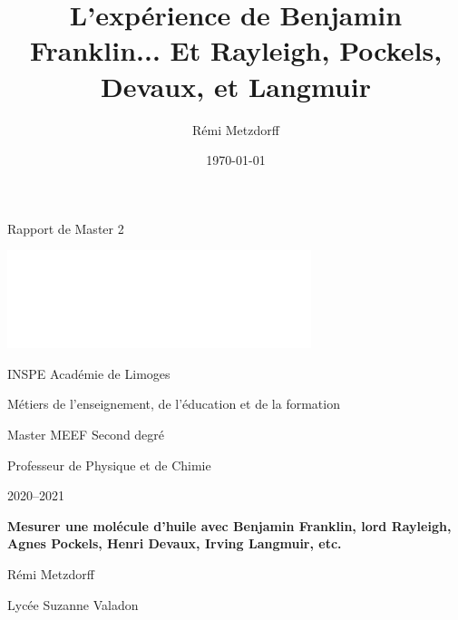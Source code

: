 \documentclass[12pt,a4paper]{article}
\title{L'expérience de Benjamin Franklin... Et Rayleigh, Pockels, Devaux, et Langmuir}
\author{Rémi Metzdorff}
\date{\today}
\newenvironment{header}
{%
	\addcontentsline{ldf}{figure}{0}%
	\begin{header_env}\qquad\Large\bf}
	{\end{header_env}}
\begin{document}

\begin{header}
\begin{minipage}{0.55\textwidth}
Rapport de Master 2
\end{minipage}
\begin{minipage}{0.38\textwidth}
\href{https://www.unilim.fr/}{\includegraphics[scale=1]{logo.png}}
\end{minipage}
\end{header}

\vspace{30pt}
\begin{spacing}{1.2}
{\bf
\begin{Large}
\noindent
\textcolor{gray_unilim}{INSPE Académie de Limoges}
\end{Large}

\begin{large}
\noindent
\textcolor{gray_unilim}{Métiers de l'enseignement, de l'éducation et de la formation}

\noindent
\textcolor{orange_unilim}{Master MEEF Second degré}

\noindent
\textcolor{orange_unilim}{Professeur de Physique et de Chimie}
\end{large}
}

\vspace{20pt}

\noindent
\textcolor{gray_unilim}{2020--2021}

\vspace{40pt}
\begin{large}
\bf
\noindent
\textcolor{orange_unilim}{Mesurer une molécule d'huile avec Benjamin Franklin, lord Rayleigh, Agnes Pockels,  Henri Devaux, Irving Langmuir, etc.}

\vspace{150pt}
\noindent
\textcolor{gray_unilim}{Rémi Metzdorff}

\noindent
\textcolor{orange_unilim}{Lycée Suzanne Valadon}
\end{large}
\end{spacing}
\end{document}
